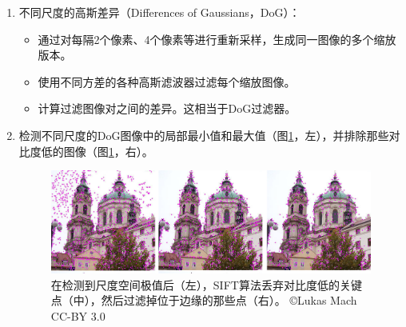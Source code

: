 \begin{enumerate}
\item 不同尺度的高斯差异（Differences of Gaussians，DoG）：

\begin{itemize}

\item 通过对每隔2个像素、4个像素等进行重新采样，生成同一图像的多个缩放版本。
\item 使用不同方差的各种高斯滤波器过滤每个缩放图像。
\item 计算过滤图像对之间的差异。这相当于DoG过滤器。
\end{itemize}


\item 检测不同尺度的DoG图像中的局部最小值和最大值（图\ref{fig:siftrejection}，左），并排除那些对比度低的图像（图\ref{fig:siftrejection}，右）。

\begin{figure}
	\centering
		\includegraphics[width=\textwidth]{figs/siftrejection.png}
	\caption{在检测到尺度空间极值后（左），SIFT算法丢弃对比度低的关键点（中），然后过滤掉位于边缘的那些点（右）。 \copyright Lukas Mach CC-BY 3.0}
	\label{fig:siftrejection}
\end{figure}


\end{enumerate}
